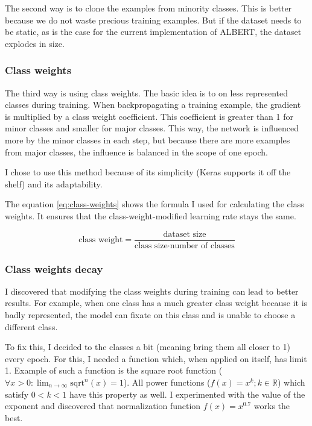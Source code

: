 \documentclass[
  printed, %
  color,   %
  table,   %
  oneside, %
  lof,     %
  lot,     %
]{fithesis3}
\begin{document}
The second way is to clone the examples from minority classes. This is better because we do not waste precious training examples. But if the dataset needs to be static, as is the case for the current implementation of ALBERT, the dataset explodes in size.

\subsubsection{Class weights}
\label{sec:class-weights}
The third way is using class weights\parencite{class-weights}. The basic idea is to  on less represented classes during training. When backpropagating a training example, the gradient is multiplied by a class weight coefficient. This coefficient is greater than 1 for minor classes and smaller for major classes. This way, the network is influenced more by the minor classes in each step, but because there are more examples from major classes, the influence is balanced in the scope of one epoch.

I chose to use this method because of its simplicity (Keras supports it off the shelf) and its adaptability.

The equation \ref{eq:class-weights} shows the formula I used for calculating the class weights. It ensures that the class-weight-modified learning rate stays the same.

\begin{equation}
\text{class weight} = \frac{\text{dataset size}}{\text{class size} \cdot \text{number of classes}} 
\label{eq:class-weights}
\end{equation}


\subsubsection{Class weights decay}
\label{sec:dynamic-class-weights}
I discovered that modifying the class weights during training can lead to better results. For example, when one class has a much greater class weight because it is badly represented, the model can fixate on this class and is unable to choose a different class.

To fix this, I decided to  the classes a bit (meaning bring them all closer to 1) every epoch. For this, I needed a function which, when applied on itself, has limit 1. Example of such a function is the square root function ($\forall x>0: \lim_{n\to\infty} \text{sqrt}^n(x) = 1$). All power functions ($f(x) = x^k; k \in \mathbb{R}$) which satisfy $0 < k < 1$ have this property as well.
I experimented with the value of the exponent and discovered that normalization function $f(x) = x^{0.7}$ works the best.
\end{document}
